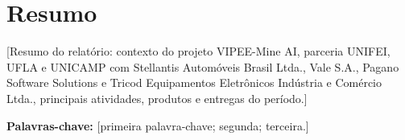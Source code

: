 \chapter*{Resumo}

[Resumo do relatório: contexto do projeto VIPEE-Mine AI, parceria UNIFEI, UFLA e UNICAMP com Stellantis Automóveis Brasil Ltda., Vale S.A., Pagano Software Solutions e Tricod Equipamentos Eletrônicos Indústria e Comércio Ltda., principais atividades, produtos e entregas do período.]

\noindent\textbf{Palavras-chave:} [primeira palavra-chave; segunda; terceira.]

\clearpage
